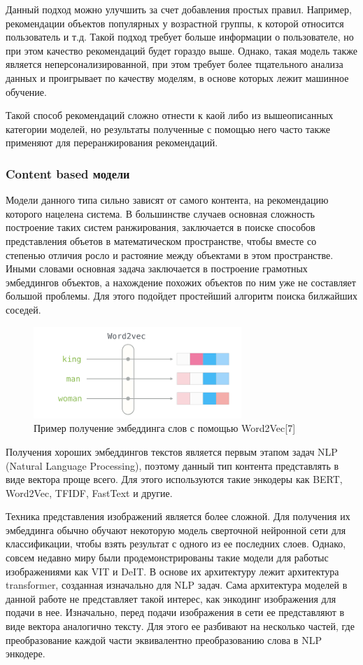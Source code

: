 \documentclass[bachelor, och, coursework]{SCWorks}
\begin{document}
Данный подход можно улучшить за счет добавления простых правил. Например, рекомендации объектов популярных у
возрастной группы, к которой относится пользователь и т.д. Такой подход требует больше информации о пользователе,
но при этом качество рекомендаций будет гораздо выше. Однако, такая модель также является неперсонализированной,
при этом требует более тщательного анализа данных и проигрывает по качеству моделям, в основе которых лежит машинное
обучение.

Такой способ рекомендаций сложно отнести к каой либо из вышеописанных категории моделей, но результаты полученные
с помощью него часто также применяют для переранжирования рекомендаций.
\subsubsection{Content based модели}
Модели данного типа сильно зависят от самого контента, на рекомендацию которого нацелена система. В большинстве случаев
основная сложность построение таких систем ранжирования, заключается в поиске способов представления объетов в математическом
пространстве, чтобы вместе со степенью отличия росло и растояние между объектами в этом пространстве. Иными словами
основная задача заключается в построение грамотных эмбеддингов объектов, а нахождение похожих объектов по ним уже не
составляет большой проблемы. Для этого подойдет простейший алгоритм поиска билжайших соседей.

\begin{figure}[H]
    \centering
    \includegraphics[width=0.7\textwidth]{pic/5}
    \caption{Пример получение эмбеддинга слов с помощью Word2Vec[7]}
    \label{fig:img1}
\end{figure}

Получения хороших эмбеддингов текстов является первым этапом задач NLP (Natural Language Processing), поэтому данный тип
контента представлять в виде вектора проще всего. Для этого используются такие энкодеры как BERT, Word2Vec, TFIDF, FastText и другие.

Техника представления изображений является более сложной. Для получения их эмбеддинга обычно обучают некоторую модель сверточной нейронной сети для
классификации, чтобы взять результат с одного из ее последних слоев. Однако, совсем недавно миру были продемонстрированы такие модели
для работыс изображениями как VIT и DeIT. В основе их архитектуру лежит архитектура transformer, созданная изначально для NLP задач.
Сама архитектура моделей в данной работе не представляет такой интерес, как энкодинг изображения для подачи в нее. Изначально,
перед подачи изображения в сети ее представляют в виде вектора аналогично тексту. Для этого ее разбивают на несколько
частей, где преобразование каждой части эквивалентно преобразованию слова в NLP энкодере.
\end{document}
